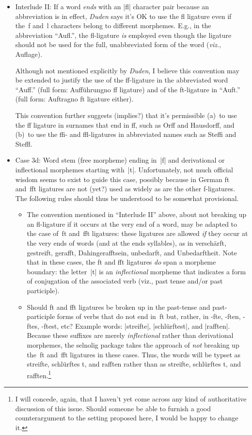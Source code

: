 \documentclass[11pt]{article}
\newcommand{\pkg}[1]{\textsf{#1}}
\begin{document}
\begin{itemize}
\begin{itemize}
\item Interlude II: If a word \emph{ends} with an |fl| character pair because an abbreviation is in effect, \emph{Duden} says it's OK to use the fl ligature even if the~f and~l characters belong to different morphemes. E.g., in the abbreviation \enquote{Aufl.}, the fl-ligature \emph{is} employed even though the ligature should not be used for the full, unabbreviated form of the word (\emph{viz.}, Auflage).

Although not mentioned explicitly by \emph{Duden}, I believe this convention may be extended to justify the use of the ff-ligature in the abbreviated word \enquote{Auff.} (full form: Aufführung\textemdash no ff ligature) and of the ft-ligature in \enquote{Auft.} (full form: Auftrag\textemdash no ft ligature either).

This convention further suggests (implies?) that it's permissible (a)~to use the ff ligature in surnames that end in ff, such as Orff and Hausdorff, and (b)~to use the ffi- and ffl-ligatures in abbreviated names such as Steffi and Steffl. 

\item Case 3d: Word stem (free morpheme) ending in~|f| and derivational or inflectional morphemes starting with~|t|. Unfortunately, not much official wisdom seems to exist to guide this case, possibly because in German ft and~fft ligatures are not (yet?) used as widely as are the other f-ligatures. The following rules should thus be understood to be somewhat provisional.

\begin{itemize}
\item The convention mentioned in \enquote{Interlude II} above, about not breaking up an fl-ligature if it occurs at the very end of a word, may be adapted to the case of~ft and~fft ligatures: these ligatures are allowed \emph{if} they occur at the very ends of words (and at the ends syllables), as in verschärft, gestreift, gerafft, Dahingerafftsein, unbedarft, and Unbedarftheit. Note that in these cases, the ft and fft ligatures \emph{do} span a morpheme boundary: the letter~|t| is an \emph{inflectional} morpheme that indicates a form of conjugation of the associated verb (viz., past tense and/or past participle).

\item Should ft and fft ligatures be broken up in the past-tense and past-participle forms of verbs that do not end in~ft but, rather, in -fte, -ften, -ftes, -ftest, etc? Example words: |streifte|, |schlürftest|, and |rafften|. Because these suffixes are merely \emph{inflectional} rather than derivational morphemes, the \pkg{selnolig} package takes the approach of \emph{not} breaking up the~ft and~fft ligatures in these cases. Thus, the words will be typset as streifte, schlürftes\kern0pt t, and rafften rather than as streif\breaklig te, schlürf\breaklig tes\kern0pt t, and raff\breaklig ten.\footnote{I will concede, again, that I haven't yet come across any kind of authoritative discussion of this issue. Should someone be able to furnish a good counterargument to the setting proposed here, I would be happy to change it.}


\end{itemize}
\end{itemize}
\end{itemize}
\end{document}
